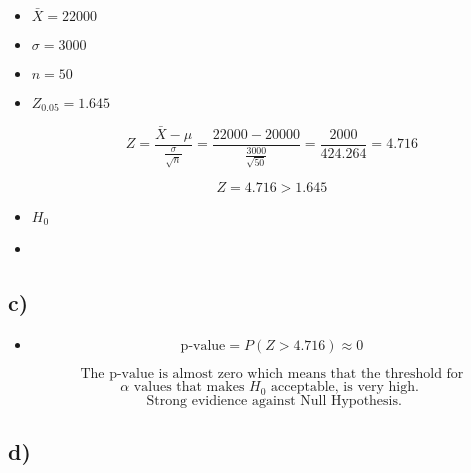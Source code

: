 \documentclass[12pt]{article}
\begin{document}
\begin{itemize}

    \item[] \( \bar{X} = 22000 \)

    \item[] \( \sigma = 3000 \)

    \item[] \( n = 50 \)

    \item[] \( Z_{0.05} = 1.645 \)

    \[ Z = \frac{\bar{X} - \mu}{\frac{\sigma}{\sqrt{n}}} = \frac{22000 - 20000}{\frac{3000}{\sqrt{50}}} = \frac{2000}{424.264} = 4.716 \]

    \[ Z = 4.716 > 1.645 \] 
    \item[]  \(H_0\) 
    \item[] 
    
\end{itemize}




\subsection*{c)} 

\begin{itemize}

    \item[] \[ \text{p-value} = P(Z > 4.716) \approx 0\]

    \[ \text{ The p-value is almost zero which means that the threshold for } \] 
    \[  \alpha  \text{ values that makes }   H_0   \text{ acceptable, is very high. } \]
    \[ \text{ Strong evidience against Null Hypothesis.} \]
    
\end{itemize}




\subsection*{d)} 
\end{document}

